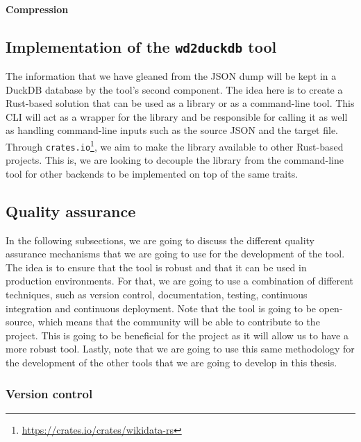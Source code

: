\paragraph{Compression}





\subsection{Implementation of the \texttt{wd2duckdb} tool}

The information that we have gleaned from the JSON dump will be kept in a DuckDB database by the tool's second component. The idea here is to create a Rust-based solution that can be used as a library or as a command-line tool. This CLI will act as a wrapper for the library and be responsible for calling it as well as handling command-line inputs such as the source JSON and the target file. Through \texttt{crates.io}\footnote{\url{https://crates.io/crates/wikidata-rs}}, we aim to make the library available to other Rust-based projects. This is, we are looking to decouple the library from the command-line tool for other backends to be implemented on top of the same traits.

\subsection{Quality assurance}

In the following subsections, we are going to discuss the different quality assurance mechanisms that we are going to use for the development of the tool. The idea is to ensure that the tool is robust and that it can be used in production environments. For that, we are going to use a combination of different techniques, such as version control, documentation, testing, continuous integration and continuous deployment. Note that the tool is going to be open-source, which means that the community will be able to contribute to the project. This is going to be beneficial for the project as it will allow us to have a more robust tool. Lastly, note that we are going to use this same methodology for the development of the other tools that we are going to develop in this thesis.

\subsubsection{Version control}

